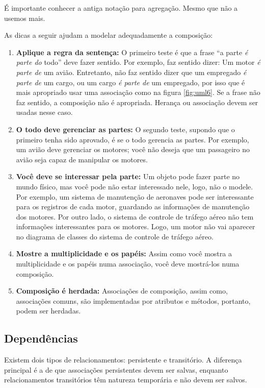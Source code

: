 \documentclass[
	article,			%
	12pt,				%
	openright,
	twoside,			%
	a4paper,			%
	english,			%
	french,
	brazil,				%
	sumario=tradicional
	]{abntex2}
\begin{document}
É importante conhecer a antiga notação para agregação. Mesmo que não a usemos mais.

As dicas a seguir ajudam a modelar adequadamente a composição:
\begin{enumerate}
\item \textbf{Aplique a regra da sentença:} O primeiro teste é que a frase ``a parte \emph{é parte do} todo'' deve fazer sentido. Por exemplo, faz sentido dizer: Um motor \emph{é parte de} um avião. Entretanto, não faz sentido dizer que um empregado \emph{é parte de} um cargo, ou um cargo \emph{é parte de} um empregado, por isso que é mais apropriado usar uma associação como na figura \ref{fig:uml6}. Se a frase não faz sentido, a composição não é apropriada. Herança ou associação devem ser usadas nesse caso.

\item \textbf{O todo deve gerenciar as partes:} O segundo teste, supondo que o primeiro tenha sido aprovado, é se o todo gerencia as partes. Por exemplo, um avião deve gerenciar os motores; você não deseja que um passageiro no avião seja capaz de manipular os motores.

\item \textbf{Você deve se interessar pela parte:} Um objeto pode fazer parte no mundo físico, mas você pode não estar interessado nele, logo, não o modele. Por exemplo, um sistema de manutenção de aeronaves pode ser interessante para os registros de cada motor, guardando as informações de manutenção dos motores. Por outro lado, o sistema de controle de tráfego aéreo não tem informações interessantes para os motores. Logo, um motor não vai aparecer no diagrama de classes do sistema de controle de tráfego aéreo.

\item \textbf{Mostre a multiplicidade e os papéis:} Assim como você mostra a multiplicidade e os papéis numa associação, você deve mostrá-los numa composição.

\item \textbf{Composição é herdada:} Associações de composição, assim como, associações comuns, são implementadas por atributos e métodos, portanto, podem ser herdadas.
\end{enumerate}

\subsection{Dependências}

Existem dois tipos de relacionamentos: persistente e transitório. A diferença principal é a de que associações persistentes devem ser salvas, enquanto relacionamentos transitórios têm natureza temporária e não devem ser salvos.
\end{document}
